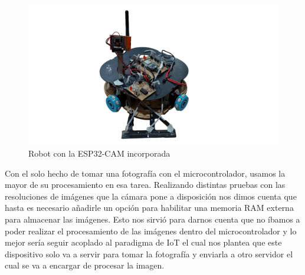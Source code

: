 \begin{figure}[H]
   \centering
   \includegraphics[width=1.0\linewidth]{images/robot_camara.png}
   \caption{Robot con la ESP32-CAM incorporada}
   \label{fig:robot_camara}
\end{figure}

Con el solo hecho de tomar una fotografía con el microcontrolador, usamos la mayor de su procesamiento en esa tarea. Realizando distintas pruebas con las resoluciones de imágenes que la cámara pone a disposición nos dimos cuenta que hasta es necesario añadirle un opción para habilitar una memoria RAM externa para almacenar las imágenes. Esto nos sirvió para darnos cuenta que no íbamos a poder realizar el procesamiento de las imágenes dentro del microcontrolador y lo mejor sería seguir acoplado al paradigma de IoT el cual nos plantea que este dispositivo solo va a servir para tomar la fotografía y enviarla a otro servidor el cual se va a encargar de procesar la imagen.